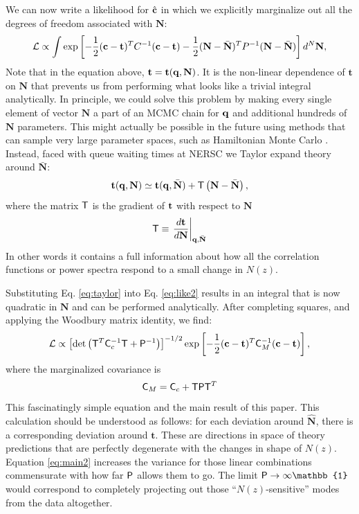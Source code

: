 \documentclass[a4paper,11pt]{article}
\newcommand{\vt}{\mathbf{t}}
\newcommand{\vN}{\mathbf{N}}
\begin{document}
      We can now write a likelihood for $\hat{\bf c}$ in which we explicitly marginalize out all the degrees of freedom associated with $\vN$:
      \begin{equation}
        \mathcal{L} \propto  \int \exp\left [-\frac{1}{2} ({\bf c}-\vt)^T C^{-1} ({\bf c}-\vt) -\frac{1}{2} (\vN - \bar{\vN})^T P^{-1} (\vN -\bar{\vN}) \right]  d^N\vN, \label{eq:like2}
      \end{equation}
      Note that in the equation above, $\vt=\vt({\bf q},\vN)$. It is the non-linear dependence of $\vt$ on $\vN$ that prevents us from performing what looks like a trivial integral analytically. In principle, we could solve this problem by making every single element of vector $\vN$ a part of an MCMC chain for ${\bf q}$ and additional hundreds of $\vN$ parameters. This might actually be possible in the future using methods that can sample very large parameter spaces, such as Hamiltonian Monte Carlo \cite{1987PhLB..195..216D}. Instead, faced with queue waiting times at NERSC we Taylor expand theory around $\bar{\vN}$:
      \begin{equation}
        \vt({\bf q},\vN) \simeq \vt({\bf q},\bar{\vN}) + {\sf T} \left(\vN - \bar{\vN} \right), \label{eq:taylor}
      \end{equation}
      where the matrix ${\sf T}$ is the gradient of ${\bf t}$ with respect to $\vN$
      \begin{equation}
        {\sf T}\equiv \left.\frac{d{\bf t}}{d\vN}\right|_{{\bf q},\bar{\vN}}
        \label{eq:Tmat}
      \end{equation}
      In other words it contains a full information about how all the correlation functions or power spectra respond to a small change in $N(z)$.

      Substituting Eq. \ref{eq:taylor} into Eq. \ref{eq:like2} results in an integral that is now quadratic in $\vN$ and can be performed analytically. After completing squares, and applying the Woodbury matrix identity, we find:
      \begin{equation}
        \mathcal{L} \propto \left[{\rm det}\left({\sf T}^T {\sf C}_c^{-1} {\sf T} +{\sf P}^{-1}\right)\right]^{-1/2} \exp\left [-\frac{1}{2} ({\bf c}-\vt)^T {\sf C}_M^{-1} ({\bf c}-\vt) \right], \label{eq:main1}
      \end{equation}
      where the  marginalized covariance is
      \begin{equation}
        {\sf C}_M = {\sf C}_c + {\sf T}{\sf P}{\sf T}^T \label{eq:main2}
      \end{equation}
      This  fascinatingly simple equation and the main result of this paper. This calculation should be understood as follows: for each deviation around $\hat{\vN}$, there is a corresponding deviation around $\vt$. These are directions in space of theory predictions that are perfectly degenerate with the changes in shape of $N(z)$.  Equation \ref{eq:main2}  increases the variance for those linear combinations commensurate with how far ${\sf P}$ allows them to go. The limit ${\sf P}\rightarrow\infty\mathbb{1}$ would correspond to completely projecting out those ``$N(z)$-sensitive'' modes from the data altogether. 
\end{document}
